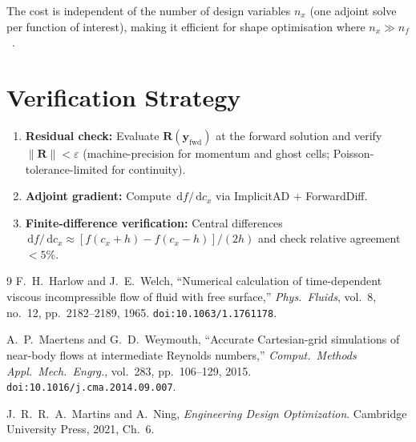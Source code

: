 \documentclass[11pt]{article}
\newcommand{\vect}[1]{\bm{#1}}
\newcommand{\dd}{\,\mathrm{d}}
\begin{document}
The cost is independent of the number of design variables $n_x$ (one adjoint
solve per function of interest), making it efficient for shape optimisation
where $n_x\gg n_f$~\cite{Martins2021}.

\section{Verification Strategy}

\begin{enumerate}
  \item \textbf{Residual check:}
    Evaluate $\vect{R}(\vect{y}_{\mathrm{fwd}})$ at the forward solution
    and verify $\|\vect{R}\|<\varepsilon$ (machine-precision for momentum
    and ghost cells; Poisson-tolerance-limited for continuity).
  \item \textbf{Adjoint gradient:}
    Compute $\dd f/\dd c_x$ via ImplicitAD + ForwardDiff.
  \item \textbf{Finite-difference verification:}
    Central differences
    $\dd f/\dd c_x \approx [f(c_x{+}h)-f(c_x{-}h)]/(2h)$
    and check relative agreement $<5\%$.
\end{enumerate}

\begin{thebibliography}{9}
  F.~H.~Harlow and J.~E.~Welch,
  ``Numerical calculation of time-dependent viscous incompressible flow of
  fluid with free surface,''
  \emph{Phys.\ Fluids}, vol.~8, no.~12, pp.~2182--2189, 1965.
  \texttt{doi:10.1063/1.1761178}.

  A.~P.~Maertens and G.~D.~Weymouth,
  ``Accurate Cartesian-grid simulations of near-body flows at intermediate
  Reynolds numbers,''
  \emph{Comput.\ Methods Appl.\ Mech.\ Engrg.}, vol.~283, pp.~106--129, 2015.
  \texttt{doi:10.1016/j.cma.2014.09.007}.

  J.~R.~R.~A.~Martins and A.~Ning,
  \emph{Engineering Design Optimization}.
  Cambridge University Press, 2021, Ch.~6.
\end{thebibliography}
\end{document}
